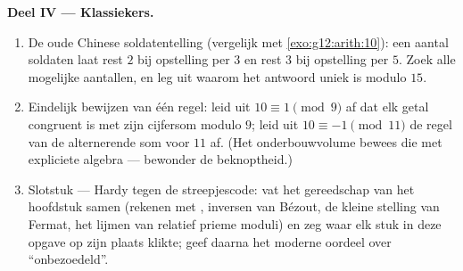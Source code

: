 \begin{problem}
\medskip
\noindent\textbf{Deel IV --- Klassiekers.}
\begin{enumerate}[resume]
  \item De oude Chinese soldatentelling (vergelijk met
        \cref{exo:g12:arith:10}): een aantal soldaten laat rest $2$ bij
        opstelling per $3$ en rest $3$ bij opstelling per $5$. Zoek alle
        mogelijke aantallen, en leg uit waarom het antwoord uniek is modulo
        $15$.
  \item Eindelijk bewijzen van één regel: leid uit $10 \equiv 1 \pmod 9$ af
        dat elk getal congruent is met zijn cijfersom modulo $9$; leid uit
        $10 \equiv -1 \pmod{11}$ de regel van de alternerende som voor $11$
        af. (Het onderbouwvolume bewees die met expliciete algebra --- bewonder
        de beknoptheid.)
  \item Slotstuk --- Hardy tegen de streepjescode: vat het gereedschap van het
        hoofdstuk samen (rekenen met , inversen van Bézout, de
        kleine stelling van Fermat, het lijmen van relatief prieme moduli) en
        zeg waar elk stuk in deze opgave op zijn plaats klikte; geef daarna het
        moderne oordeel over ``onbezoedeld''.
\end{enumerate}
\end{problem}
